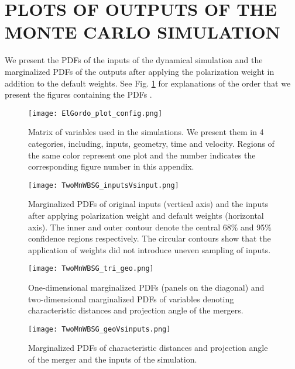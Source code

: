 \section{PLOTS OF OUTPUTS OF THE MONTE CARLO SIMULATION}
We present the PDFs of the inputs of the dynamical simulation and the
marginalized PDFs of the outputs after applying the polarization weight in
addition to the default weights. See Fig. \ref{fig:plot_config} for explanations of
the order that we present the figures containing the PDFs . 
\begin{figure}
	\begin{center}
	\texttt{[image: ElGordo\_plot\_config.png]}
	\end{center}
	\caption{Matrix of variables used in the simulations. We present them in
	4 categories, including, inputs, geometry, time and velocity. Regions of
	the same color represent one plot and the number
indicates the corresponding figure number in this appendix.
\label{fig:plot_config}
}
\end{figure}
\label{app:results}
\clearpage
\begin{figure*}
	\begin{minipage}{180mm}
	\begin{center}
	\texttt{[image: TwoMnWBSG\_inputsVsinput.png]}
	\caption{Marginalized PDFs of original inputs (vertical axis) and the inputs after
applying polarization weight and default weights (horizontal axis). The inner and outer contour
denote the central 68\% and 95\% confidence regions respectively.
The circular contours show that the application of weights did not introduce
uneven sampling of inputs. }
	\end{center}
	\end{minipage}
\end{figure*}
\begin{figure*}
\begin{minipage}{180mm}
	\begin{center}
	\texttt{[image: TwoMnWBSG\_tri\_geo.png]}
	\caption{One-dimensional marginalized PDFs (panels on the diagonal) and
		two-dimensional marginalized PDFs of variables
		denoting characteristic distances and projection angle of the mergers.
	\label{fig:geom_geom}
	}
	\end{center}
	\end{minipage}
\end{figure*}
\begin{figure*}
\begin{minipage}{180mm}
	\begin{center}
	\texttt{[image: TwoMnWBSG\_geoVsinputs.png]}
	\caption{Marginalized PDFs of characteristic distances and projection
		angle of the merger and the inputs of the simulation.}
	\end{center}
	\end{minipage}
\end{figure*}
